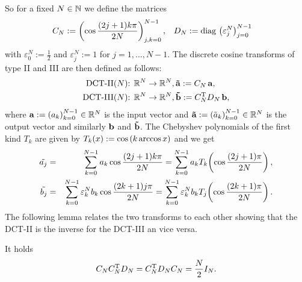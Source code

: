 So for a fixed $N \in \mathbb{N}$ we define the matrices
\begin{align}
  \nonumber
  C_N & := \left(\cos \frac{(2j+1)k \pi}{2N}\right)_{j,k = 0}^{N-1}, & D_N & := \text{\rm{diag}}\, \left(\varepsilon_j^N\right)_{j = 0}^{N-1}
\end{align}
with $\varepsilon_0^N := \frac{1}{2}$ and $\varepsilon_j^N := 1$ for $j = 1,\ldots,N-1$.
The discrete cosine transforms of type II and III are then defined as follows:
\begin{align}
  \nonumber
  \text{DCT-II($N$): } & \mathbb{R}^N \rightarrow \mathbb{R}^N, \mathbf{\tilde{a}} := C_{N}\, \mathbf{a},\\
  \nonumber
  \text{DCT-III($N$): } & \mathbb{R}^N \rightarrow \mathbb{R}^N, \mathbf{\tilde{b}} := C_{N}^{\text{\rm{T}}} D_{N}\, \mathbf{b}, 
\end{align}
where $\mathbf{a} := \left(a_k\right)_{k=0}^{N-1} \in \mathbb{R}^N$ is the input vector and $\mathbf{\tilde{a}} := 
\left(\tilde{a}_k\right)_{k=0}^{N-1} \in \mathbb{R}^N$ is the output vector and similarly $\mathbf{b}$ and $\mathbf{\tilde{b}}$. 
The Chebyshev polynomials of the first kind $T_{k}$ are given by $T_{k}{\hspace{-0.4ex}}\left(x\right) := \cos{\hspace{-0.4ex}}\left(k \arccos x\right)$ 
and we get
\begin{eqnarray*}
  \tilde{a_{j}} & = & \sum_{k = 0}^{N-1} a_{k} \cos \frac{(2j+1)k \pi}{2N} = \sum_{k = 0}^{N-1} a_{k} T_{k}{\hspace{-0.4ex}}\left(\cos \frac{(2j+1) \pi}{2N}\right),\\
  \tilde{b_{j}} & = & \sum_{k = 0}^{N-1} \varepsilon_k^N b_{k} \cos \frac{(2k+1)j \pi}{2N} = \sum_{k = 0}^{N-1} \varepsilon_k^N b_{k} T_{j}{\hspace{-0.4ex}}\left(\cos \frac{(2k+1) \pi}{2N}\right).\\
\end{eqnarray*}
The following lemma relates the two transforms to each other showing that the DCT-II is the inverse for the DCT-III an vice versa.
\begin{lemma}
  It holds
  $$ C_{N}C_{N}^{\text{\rm{T}}}D_{N} = C_{N}^{\text{\rm{T}}}D_{N}C_{N} = \frac{N}{2} I_{N}. $$
\end{lemma}

